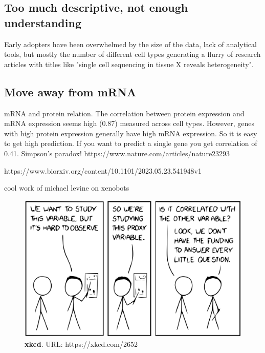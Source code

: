\subsection{Too much descriptive, not enough understanding}

Early adopters have been overwhelmed by the size of the data, lack of analytical tools, but mostly the number of different cell types generating a flurry of research articles with titles like "single cell sequencing in tissue X reveals heterogeneity".  

\subsection{Move away from mRNA}

mRNA and protein relation.
The correlation between protein expression and mRNA expression seems high (0.87) measured across cell types. However, genes with high protein expression generally have high mRNA expression. So it is easy to get high prediction. If you want to predict a single gene you get correlation of 0.41. Simpson's paradox! 
https://www.nature.com/articles/nature23293

https://www.biorxiv.org/content/10.1101/2023.05.23.541948v1

cool work of michael levine on xenobots


\begin{figure}[H]
    \includegraphics[width=\linewidth]{ch.discussion/imgs/xkcd.png}
    \caption{\textbf{xkcd}. URL: https://xkcd.com/2652}
    \label{fig:xkcd}
\end{figure}

